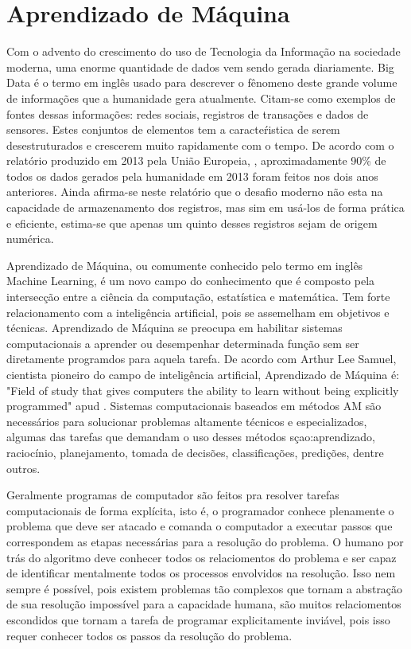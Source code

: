\chapter{Aprendizado de Máquina}

Com o advento do crescimento do uso de Tecnologia da Informação na sociedade moderna, uma enorme quantidade de dados vem sendo gerada diariamente. Big Data é o termo em inglês usado para descrever o fênomeno deste grande volume de informações que a humanidade gera atualmente. Citam-se como exemplos de fontes dessas informações: redes sociais, registros de transações e dados de sensores. Estes conjuntos de elementos tem a caracteŕistica de serem desestruturados e crescerem muito rapidamente com o tempo. De acordo com o relatório produzido em 2013 pela União Europeia, , aproximadamente 90\% de todos os dados gerados pela humanidade em 2013 foram feitos nos dois anos anteriores. Ainda afirma-se neste relatório que o desafio moderno não esta na capacidade de armazenamento dos registros, mas sim em usá-los de forma prática e eficiente, estima-se que apenas um quinto desses registros sejam de origem numérica.  

Aprendizado de Máquina, ou comumente conhecido pelo termo em inglês Machine Learning, é um novo campo do conhecimento que é composto pela intersecção entre a ciência da computação, estatística e matemática. Tem forte relacionamento  com a inteligência artificial, pois se assemelham em objetivos e técnicas. Aprendizado de Máquina se preocupa em habilitar sistemas computacionais a aprender ou desempenhar determinada função sem ser diretamente programdos para aquela tarefa. De acordo com Arthur Lee Samuel, cientista pioneiro do campo de inteligência artificial, Aprendizado de Máquina é: "Field of study that gives computers the ability to learn without being explicitly programmed" apud . Sistemas computacionais baseados em métodos AM são necessários para solucionar problemas altamente técnicos e especializados, algumas das tarefas que demandam o uso desses métodos sçao:aprendizado, raciocínio, planejamento, tomada de decisões, classificações, predições, dentre outros. 

Geralmente programas de computador são feitos pra resolver tarefas computacionais de forma explícita, isto é, o programador conhece plenamente o problema que deve ser atacado e comanda o computador a executar passos que correspondem as etapas necessárias para a resolução do problema. O humano por trás do algoritmo deve conhecer todos os relaciomentos do problema e ser capaz de identificar mentalmente todos os processos envolvidos na resolução. Isso nem sempre é possível, pois existem problemas tão complexos que tornam a abstração de sua resolução impossível para a capacidade humana, são muitos relaciomentos escondidos que tornam a tarefa de programar explicitamente inviável, pois isso requer conhecer todos os passos da resolução do problema.

